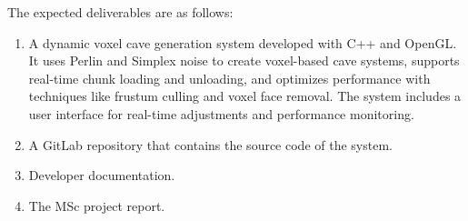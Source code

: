 The expected deliverables are as follows:
\begin{enumerate}
    \item A dynamic voxel cave generation system developed with C++ and OpenGL. It uses Perlin and Simplex noise to create voxel-based cave systems, supports real-time chunk loading and unloading, and optimizes performance with techniques like frustum culling and voxel face removal. The system includes a user interface for real-time adjustments and performance monitoring.
    \item A GitLab repository that contains the source code of the system.
    \item Developer documentation.
    \item The MSc project report.
\end{enumerate}